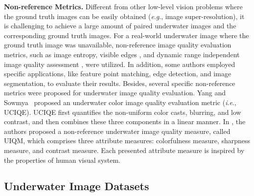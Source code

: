 \documentclass[journal]{IEEEtran}
\newcommand{\ie}{\textit{i}.\textit{e}.}
\newcommand{\eg}{\textit{e}.\textit{g}.}
\begin{document}
\noindent
\textbf{Non-reference Metrics.} Different from other low-level vision problems where the ground truth images can be easily obtained (\eg, image super-resolution), it is challenging to achieve a large amount of paired underwater images and the corresponding ground truth images. For a real-world underwater image where the ground truth image was unavailable, non-reference image quality evaluation metrics, such as image entropy, visible edges \cite{Hautiere2011}, and dynamic range independent image quality assessment \cite{Aydin2008}, were utilized.
In addition, some authors employed specific applications, like feature point matching, edge detection, and image segmentation, to evaluate their results. Besides, several specific non-reference metrics were proposed for underwater image quality evaluation. Yang and Sowmya~\cite{Yang2015} proposed an underwater color image quality evaluation metric (\ie, UCIQE). UCIQE first quantifies the non-uniform color casts, blurring, and low contrast, and then combines these three components in a linear manner.  In \cite{Panetta2016}, the authors proposed a non-reference underwater image quality measure, called UIQM, which comprises three attribute measures: colorfulness measure, sharpness measure, and contrast measure. Each presented attribute measure is inspired by the properties of human visual system.




\subsection{Underwater Image Datasets}
\end{document}
